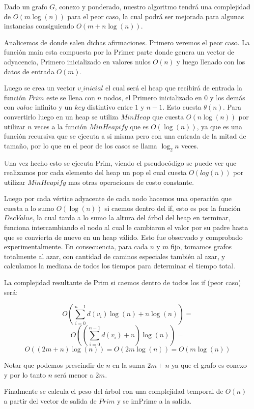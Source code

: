 Dado un grafo $G$, conexo y ponderado, nuestro algoritmo tendrá una complejidad de $O(m \log(n))$ para el peor caso, la cual podrá ser mejorada para algunas instancias consiguiendo $O(m + n \log(n))$.

Analicemos de donde salen dichas afirmaciones. Primero veremos el peor caso. La función main esta compuesta por la Primer parte donde  genera un vector de adyacencia, Primero inicializado en valores nulos $O(n)$ y luego llenado con los datos de entrada $O(m)$.

Luego se crea un vector $v\_inicial$ el cual será el heap que recibirá de entrada la función $Prim$ este se llena con $n$ nodos, el Primero inicializado en $0$ y los demás con $value$ infinito y un $key$ distintivo entre $1$ y $n-1$. 
Esto cuesta $\theta(n)$. Para convertirlo luego en un heap se utiliza $MinHeap$ que cuesta $O(n \log(n))$ por utilizar $n$ veces a la función $MinHeapify$ que es $O(\log(n))$, ya que es una función recursiva que se ejecuta a si misma pero con una entrada de la mitad de tamaño, por lo que en el peor de los casos se llama $\log_2 n$ veces.

Una vez hecho esto se ejecuta Prim, viendo el pseudocódigo se puede ver que realizamos por cada elemento del heap un pop el cual cuesta $O(log(n))$ por utilizar $MinHeapify$ mas otras operaciones de costo constante.

Luego por cada vértice adyacente de cada nodo hacemos una operación que cuesta a lo sumo $O(\log(n))$ si caemos dentro del if, esto es por la función $DecValue$, la cual tarda a lo sumo la altura del árbol del heap en terminar, funciona intercambiando el nodo al cual le cambiaron el valor por su padre hasta que se convierta de nuevo en un heap válido.
Esto fue observado y comprobado experimentalmente. En consecuencia, para cada $n$ y $m$ fijo, tomamos grafos totalmente al azar, con cantidad de caminos especiales también al azar, y calculamos la mediana de todos los tiempos para determinar el tiempo total.

La complejidad resultante de Prim si caemos dentro de todos los if (peor caso) será:

	$$O( \sum_{i=0}^{n-1}d(v_{i}) \log(n) + n \log(n) ) = $$
	$$O( (\sum_{i=0}^{n-1}d(v_{i}) + n) \log(n) ) = $$
	$$O( (2m + n) \log(n) ) = O( 2m \log(n) ) = O(m \log(n))$$ 

Notar que podemos prescindir de $n$ en la suma $2m+n$ ya que el grafo es conexo y por lo tanto $n$ será menor a $2m$.

Finalmente se calcula el peso del árbol con una complejidad temporal de $O(n)$ a partir del vector de salida de $Prim$ y se imPrime a la salida.

